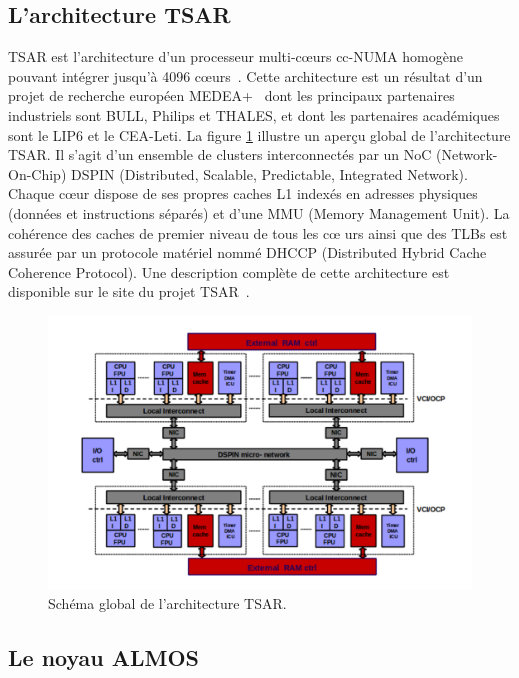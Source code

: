   \subsection{L'architecture TSAR}
  \label{sec:tsar}

    TSAR est l'architecture d’un processeur multi-c\oe urs cc-NUMA homogène
    pouvant intégrer jusqu’à 4096 c\oe urs~\cite{greiner2009tsar}. Cette
    architecture est un résultat d’un projet de recherche européen
    MEDEA+~\cite{tsar2008} dont les principaux partenaires industriels sont
    BULL, Philips et THALES, et dont les partenaires académiques sont le LIP6 et
    le CEA-Leti. La figure \ref{fig:tsar} illustre un aperçu global de
    l'architecture TSAR. Il s'agit d'un ensemble de clusters interconnectés par
    un NoC (Network-On-Chip) DSPIN (Distributed, Scalable, Predictable,
    Integrated Network). Chaque c\oe ur dispose de ses propres caches L1 indexés
    en adresses physiques (données et instructions séparés) et d'une MMU (Memory
    Management Unit). La cohérence des caches de premier niveau de tous les c\oe
    urs ainsi que des TLBs est assurée par un protocole matériel nommé DHCCP
    (Distributed Hybrid Cache Coherence Protocol). Une description complète de
    cette architecture est disponible sur le site du projet
    TSAR~\cite{tsar2008web}.

    \begin{figure}[!h]
      \centering
      \includegraphics[scale=0.16]{include/img/tsar.png}
      \caption{Schéma global de l'architecture TSAR.~\cite{greiner2009tsar}}
      \label{fig:tsar}
    \end{figure}
  
  \subsection{Le noyau ALMOS}
  \label{sec:almos}

